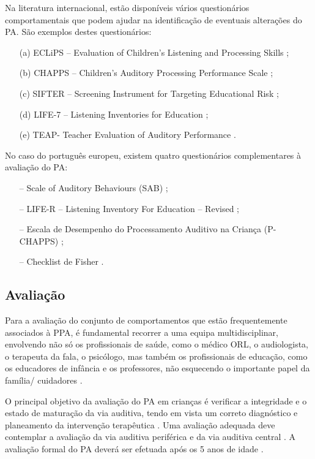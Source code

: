 \documentclass[output=paper,colorlinks,citecolor=brown,booklanguage=portuguese]{langscibook}
\begin{document}
Na literatura internacional, estão disponíveis vários questionários comportamentais que podem ajudar na identificação de eventuais alterações do PA. São exemplos destes questionários: 

\begin{enumerate}
    \item [(a)] ECLiPS – Evaluation of Children’s Listening and Processing Skills \citep{Barry2015};
\item[(b)] CHAPPS – Children’s Auditory Processing Performance Scale \citep{Smoski1998};
\item[(c)] SIFTER – Screening Instrument for Targeting Educational Risk \citep{Keith2019, Volpatto2019};
\item[(d)] LIFE-7 – Listening Inventories for Education \citep{Anderson1999, Barry2015}; 
\item[(e)] TEAP- Teacher Evaluation of Auditory Performance \citep{Keith2019, Barry2015}.
\end{enumerate}
No caso do português europeu, existem quatro questionários complementares à avaliação do PA: 

\begin{enumerate}
    \item [–] Scale of Auditory Behaviours (SAB) \citep{Nunes2015, Nunes2013};
\item [–] LIFE-R – Listening Inventory For Education – Revised \citep{Quadros2017};
\item [–] Escala de Desempenho do Processamento Auditivo na Criança (P-CHAPPS) \citep{Oliveira2013};
\item [–] Checklist de Fisher \citep{Martins2010}.
\end{enumerate}
\subsection{Avaliação}
Para a avaliação do conjunto de comportamentos que estão frequentemente associados à PPA, é fundamental recorrer a uma equipa multidisciplinar, envolvendo não só os profissionais de saúde, como o médico ORL, o audiologista, o terapeuta da fala, o psicólogo, mas também os profissionais de educação, como os educadores de infância e os professores, não esquecendo o importante papel da família/ cuidadores \citep{BSA2007}.

O principal objetivo da avaliação do PA em crianças é verificar a integridade e o estado de maturação da via auditiva, tendo em vista um correto diagnóstico e planeamento da intervenção terapêutica \citep{Bellis2015, ASHA1996}. Uma avaliação adequada deve contemplar a avaliação da via auditiva periférica e da via auditiva central \citep{Musiek2007}. A avaliação formal do PA deverá ser efetuada após os 5 anos de idade \citep{Lucker2015, Martins2017b, Shapiro2016}.
\end{document}
